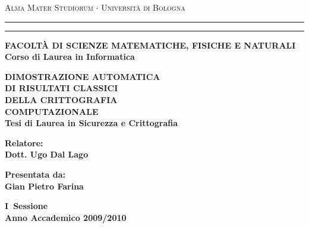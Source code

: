 \documentclass[12pt,a4paper]{report}
\begin{document}
\begin{titlepage}
\begin{center}
{{\Large{\textsc{Alma Mater Studiorum $\cdot$ Universit\`a di
Bologna}}}} \rule[0.1cm]{15.8cm}{0.1mm}
\rule[0.5cm]{15.8cm}{0.6mm}
{\small{\bf FACOLT\`A DI SCIENZE MATEMATICHE, FISICHE E NATURALI\\
Corso di Laurea in Informatica}}
\end{center}
\vspace{15mm}
\begin{center}
{\LARGE{\bf DIMOSTRAZIONE AUTOMATICA}}\\
\vspace{3mm}
{\LARGE{\bf DI RISULTATI CLASSICI}}\\
\vspace{3mm}
{\LARGE{\bf DELLA CRITTOGRAFIA}}\\
\vspace{3mm}
{\LARGE{\bf COMPUTAZIONALE}}\\
\vspace{19mm} {\large{\bf Tesi di Laurea in Sicurezza e Crittografia}}
\end{center}
\vspace{40mm}
\par
\noindent
\begin{minipage}[t]{0.47\textwidth}
{\large{\bf Relatore:\\
Dott. Ugo Dal Lago}}
\end{minipage}
\hfill
\begin{minipage}[t]{0.47\textwidth}\raggedleft
{\large{\bf Presentata da:\\
Gian Pietro Farina}}
\end{minipage}
\vspace{20mm}
\begin{center}
{\large{\bf I\textdegree \ Sessione\\%
Anno Accademico 2009/2010 }}%
\end{center}
\end{titlepage}
\end{document}
